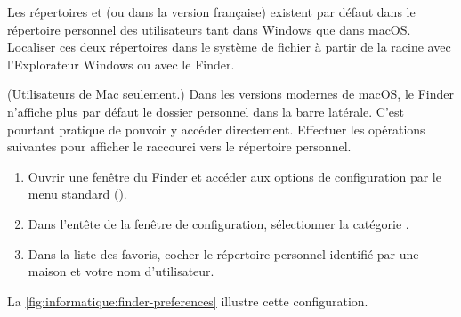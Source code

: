 \begin{exercice}[nosol]
  Les répertoires  et  (ou 
  dans la version française) existent par défaut dans le
  répertoire
  personnel des utilisateurs tant dans Windows que dans macOS.
  Localiser ces deux répertoires dans le système de fichier à partir
  de la racine avec l'Explorateur Windows
  ou avec le Finder.
\end{exercice}

\begin{exercice}[nosol]
  (Utilisateurs de Mac seulement.) Dans les versions modernes de
  macOS, le Finder n'affiche plus par défaut le dossier
  personnel dans la barre latérale. C'est pourtant pratique de pouvoir
  y accéder directement. Effectuer les opérations suivantes pour
  afficher le raccourci vers le répertoire personnel.
  \begin{enumerate}[1.]
  \item Ouvrir une fenêtre du Finder et accéder aux options de
    configuration par le menu standard 
    (\code{\cmdkey\,,}).
  \item Dans l'entête de la fenêtre de configuration, sélectionner la
    catégorie .
  \item Dans la liste des favoris, cocher le répertoire personnel
    identifié par une maison et votre nom d'utilisateur.
  \end{enumerate}
  La \autoref{fig:informatique:finder-preferences} illustre cette
  configuration.


\end{exercice}
